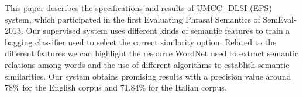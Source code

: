 This paper describes the specifications and results of UMCC\_DLSI-(EPS) system, which participated in the first Evaluating Phrasal Semantics of SemEval-2013.
 Our supervised system uses different kinds of semantic features to train a
 bagging classifier used to select the correct similarity option. Related to the
 different features we can highlight the resource WordNet used to extract
 semantic relations among words and the use of different algorithms to establish
 semantic similarities. Our system obtains promising results with a precision
 value around 78\% for the English corpus and 71.84\% for the Italian corpus.

